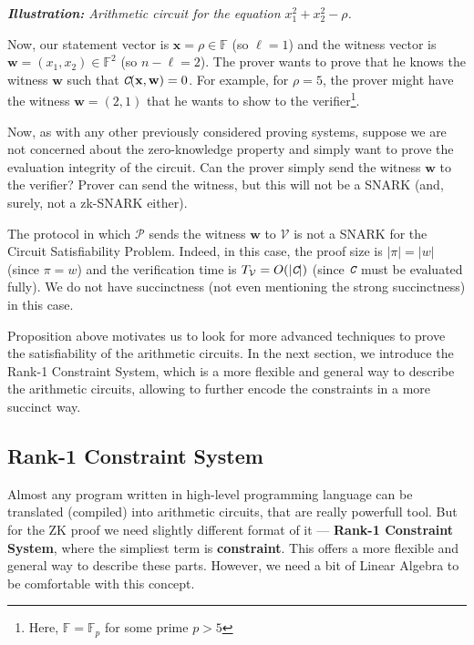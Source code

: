 \documentclass[../lecture-notes.tex]{subfiles}
\begin{document}
\begin{example}
\begin{center}
{
        }
        \scriptsize \textit{\textbf{Illustration:} Arithmetic circuit for the equation $x_1^2 + x_2^2 - \rho$.}
    \end{center}

    Now, our statement vector is $\mathbf{x} = \rho \in \mathbb{F}$ (so $\ell=1$) and the witness vector is $\mathbf{w} = (x_1,x_2) \in \mathbb{F}^2$ (so $n-\ell=2$). The prover wants to prove that he knows the witness $\mathbf{w}$ such that $\textit{\texttt{C}}(\mathbf{x},\mathbf{w}) = 0$. For example, for $\rho=5$, the prover might have the witness $\mathbf{w} = (2,1)$ that he wants to show to the verifier\footnote{Here, $\mathbb{F} = \mathbb{F}_p$ for some prime $p > 5$}.
\end{example}

Now, as with any other previously considered proving systems, suppose we are not concerned about the zero-knowledge property and simply want to prove the evaluation integrity of the circuit. Can the prover simply send the witness $\mathbf{w}$ to the verifier? Prover can send the witness, but this will not be a SNARK (and, surely, not a zk-SNARK either). 

\begin{proposition}
    The protocol in which $\mathcal{P}$ sends the witness $\mathbf{w}$ to $\mathcal{V}$ is not a SNARK for the Circuit Satisfiability Problem. Indeed, in this case, the proof size is $|\pi| = |w|$ (since $\pi=w$) and the verification time is $T_{\mathcal{V}} = O(|\textit{\texttt{C}}|)$ (since $\textit{\texttt{C}}$ must be evaluated fully). We do not have succinctness (not even mentioning the strong succinctness) in this case.
\end{proposition}

Proposition above motivates us to look for more advanced techniques to prove the satisfiability of the arithmetic circuits. In the next section, we introduce the Rank-1 Constraint System, which is a more flexible and general way to describe the arithmetic circuits, allowing to further encode the constraints in a more succinct way.

\subsection{Rank-1 Constraint System}

Almost any program written in high-level programming language can be translated (compiled) into
arithmetic circuits, that are really powerfull tool. But for the ZK proof we need slightly different
format of it --- \textbf{Rank-1 Constraint System}, where the simpliest term is \textbf{constraint}. 
This offers a more flexible and general way to describe these parts. However, we need a bit of 
Linear Algebra to be comfortable with this concept.
\end{document}
